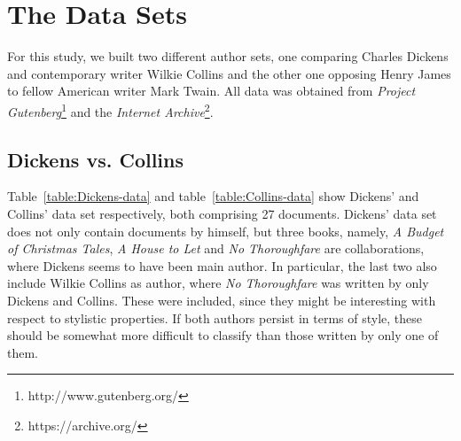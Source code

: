 \documentclass[a4paper,10pt,twoside,fleqn]{article}
\begin{document}
\section{The Data Sets} \label{sec:data}
For this study, we built two different author sets, one comparing Charles Dickens
and contemporary writer Wilkie Collins and the other one opposing Henry James 
to fellow American writer Mark Twain. 
All data was obtained from \emph{Project Gutenberg}\footnote{http://www.gutenberg.org/}
and the \emph{Internet Archive}\footnote{https://archive.org/}.

\subsection{Dickens vs. Collins}
Table~\ref{table:Dickens-data} and table~\ref{table:Collins-data} show Dickens'
and Collins' data set respectively, both comprising 27 documents.
Dickens' data set does not only contain documents by himself, but three books, namely, 
\emph{A Budget of Christmas Tales}, \emph{A House to Let} and \emph{No Thoroughfare}
are collaborations, where Dickens seems to have been main author.
In particular, the last two also include Wilkie Collins as author, where 
\emph{No Thoroughfare} was written by only Dickens and Collins. 
These were included, since they might be interesting with respect to stylistic properties.
If both authors persist in terms of style, these should be somewhat more difficult 
to classify than those written by only one of them.  
\end{document}
